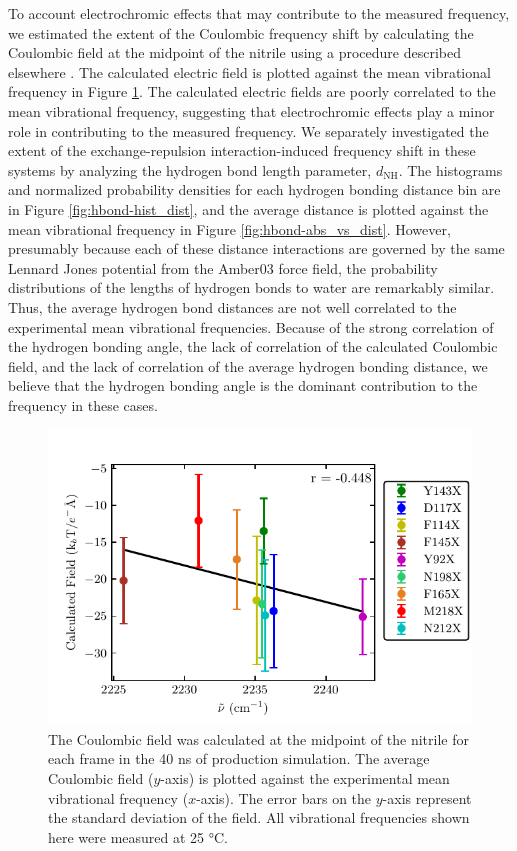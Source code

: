 To account electrochromic effects that may contribute to the measured frequency, we estimated the extent of the Coulombic frequency shift by calculating the Coulombic field at the midpoint of the nitrile using a procedure described elsewhere \cite{Ensign2011}.
The calculated electric field is plotted against the mean vibrational frequency in Figure \ref{fig:hbond-forces}.
The calculated electric fields are poorly correlated to the mean vibrational frequency, suggesting that electrochromic effects play a minor role in contributing to the measured frequency.
We separately investigated the extent of the exchange-repulsion interaction-induced frequency shift in these systems by analyzing the hydrogen bond length parameter, $d_{\text{NH}}$.
The histograms and normalized probability densities for each hydrogen bonding distance bin are in Figure \ref{fig:hbond-hist_dist}, and the average distance is plotted against the mean vibrational frequency in Figure \ref{fig:hbond-abs_vs_dist}.
However, presumably because each of these distance interactions are governed by the same Lennard Jones potential from the Amber03 force field, the probability distributions of the lengths of hydrogen bonds to water are remarkably similar.
Thus, the average hydrogen bond distances are not well correlated to the experimental mean vibrational frequencies.
Because of the strong correlation of the hydrogen bonding angle, the lack of correlation of the calculated Coulombic field, and the lack of correlation of the average hydrogen bonding distance, we believe that the hydrogen bonding angle is the dominant contribution to the frequency in these cases.

\begin{figure}
    \center
    \includegraphics[width=\single]{figures-gfp-hbond/forces.pdf}
    \caption[Calculated forces compared to the experimental nitrile frequencies]{
        The Coulombic field was calculated at the midpoint of the nitrile for each frame in the 40 ns of production simulation. 
        The average Coulombic field ($y$-axis) is plotted against the experimental mean vibrational frequency ($x$-axis). 
        The error bars on the $y$-axis represent the standard deviation of the field. 
        All vibrational frequencies shown here were measured at 25 \si{\celsius}.
    }
    \label{fig:hbond-forces}
\end{figure}

